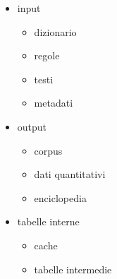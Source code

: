 \begin{itemize}
\item input
  \begin{itemize}
  \item dizionario
  \item regole
  \item testi
  \item metadati
  \end{itemize}
\item output
  \begin{itemize}
  \item corpus
  \item dati quantitativi
  \item enciclopedia
  \end{itemize}
\item tabelle interne
  \begin{itemize}
  \item cache
  \item tabelle intermedie
  \end{itemize}
\end{itemize}
